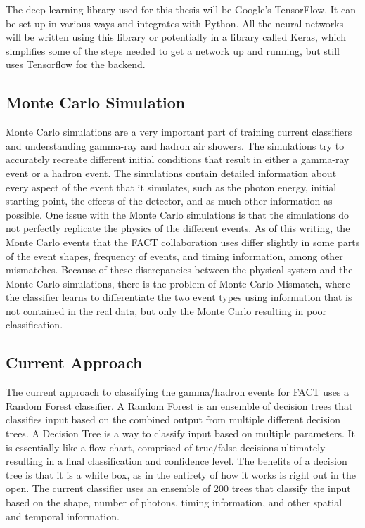 \documentclass[12pt]{article}
\begin{document}
The deep learning library used for this thesis will be Google's TensorFlow\cite{tensorflow2015-whitepaper}. It can be set up in various ways and integrates with Python. All the neural networks will be written using this library or potentially in a library called Keras\cite{chollet2015keras}, which simplifies some of the steps needed to get a network up and running, but still uses Tensorflow for the backend.

\subsection{Monte Carlo Simulation}\label{sec:mc}

Monte Carlo simulations are a very important part of training current classifiers and understanding gamma-ray and hadron air showers. The simulations try to accurately recreate different initial conditions that result in either a gamma-ray event or a hadron event. The simulations contain detailed information about every aspect of the event that it simulates, such as the photon energy, initial starting point, the effects of the detector, and as much other information as possible. One issue with the Monte Carlo simulations is that the simulations do not perfectly replicate the physics of the different events. As of this writing, the Monte Carlo events that the FACT collaboration uses differ slightly in some parts of the event shapes, frequency of events, and timing information, among other mismatches. Because of these discrepancies between the physical system and the Monte Carlo simulations, there is the problem of Monte Carlo Mismatch, where the classifier learns to differentiate the two event types using information that is not contained in the real data, but only the Monte Carlo resulting in poor classification. 

\subsection{Current Approach}\label{sec:current}

The current approach to classifying the gamma/hadron events for FACT uses a Random Forest classifier\cite{fact_classifier}. A Random Forest is an ensemble of decision trees that classifies input based on the combined output from multiple different decision trees. A Decision Tree is a way to classify input based on multiple parameters. It is essentially like a flow chart, comprised of true/false decisions ultimately resulting in a final classification and confidence level. The benefits of a decision tree is that it is a white box, as in the entirety of how it works is right out in the open. The current classifier uses an ensemble of 200 trees that classify the input based on the shape, number of photons, timing information, and other spatial and temporal information.
\end{document}
